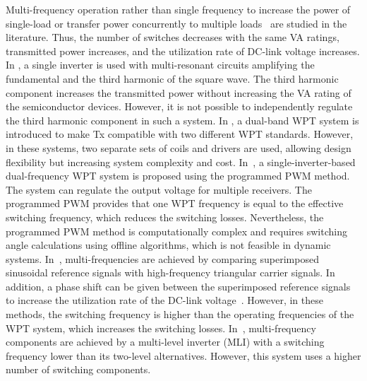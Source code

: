 \documentclass[journal]{IEEEtran}
\begin{document}
Multi-frequency operation rather than single frequency to increase the power of single-load \cite{multifreq} or transfer power concurrently to multiple loads~\cite{single-Tx,programmablePWM,GeneralizedMFMR,MFML-hybrid,MFMA-circuit,ML-inverter,ConcurrentReduced,multifrequencySuperposition, CET,timeMultiplexSIMO} are studied in the literature. 
Thus, the number of switches decreases with the same VA ratings, transmitted power increases, and the utilization rate of DC-link voltage increases. 
In \cite{multifreq}, a single inverter is used with multi-resonant circuits amplifying the fundamental and the third harmonic of the square wave.
The third harmonic component increases the transmitted power without increasing the VA rating of the semiconductor devices.
However, it is not possible to independently regulate the third harmonic component in such a system.  
In \cite{single-Tx}, a dual-band WPT system is introduced to make Tx compatible with two different WPT standards. 
However, in these systems, two separate sets of coils and drivers are used, allowing design flexibility but increasing system complexity and cost. 
In~\cite{programmablePWM}, a single-inverter-based dual-frequency WPT system is proposed using the programmed PWM method. The system can regulate the output voltage for multiple receivers.
The programmed PWM provides that one WPT frequency is equal to the effective switching frequency, which reduces the switching losses.
Nevertheless, the programmed PWM method is computationally complex and requires switching angle calculations using offline algorithms, which is not feasible in dynamic systems.
In~\cite{MFML-hybrid}, multi-frequencies are achieved by comparing superimposed sinusoidal reference signals with high-frequency triangular carrier signals.
In addition, a phase shift can be given between the superimposed reference signals to increase the utilization rate of the DC-link voltage~\cite{MFMA-circuit}.
However, in these methods, the switching frequency is higher than the operating frequencies of the WPT system, which increases the switching losses.
In~\cite{ML-inverter}, multi-frequency components are achieved by a multi-level inverter (MLI) with a switching frequency lower than its two-level alternatives. 
However, this system uses a higher number of switching components.
\end{document}

